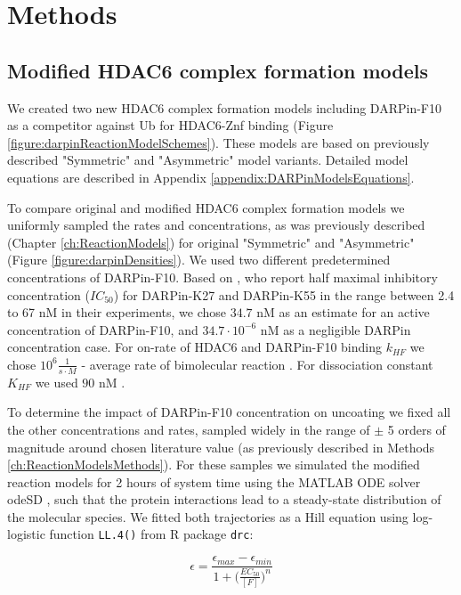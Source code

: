 \section{Methods}
\label{ch:DARPinMethods}

\subsection{Modified HDAC6 complex formation models}

We created two new HDAC6 complex formation models including DARPin-F10 as a competitor against Ub for HDAC6-Znf binding (Figure \ref{figure:darpinReactionModelSchemes}). These models are based on previously described "Symmetric" and "Asymmetric" model variants. Detailed model equations are described in Appendix \ref{appendix:DARPinModelsEquations}.

To compare original and modified HDAC6 complex formation models we uniformly sampled the rates and concentrations, as was previously described (Chapter \ref{ch:ReactionModels}) for original "Symmetric" and "Asymmetric" (Figure \ref{figure:darpinDensities}). We used two different predetermined concentrations of DARPin-F10. Based on \cite{guillard2017structural}, who report half maximal inhibitory concentration ($IC_{50}$) for DARPin-K27 and DARPin-K55 in the range between 2.4 to 67 nM in their experiments, we chose $34.7$ nM as an estimate for an active concentration of DARPin-F10, and  $34.7 \cdot 10^{-6}$ nM as a negligible DARPin concentration case. For on-rate of HDAC6 and DARPin-F10 binding $k_{HF}$ we chose $10^{6} \frac{1}{s\cdot M}$ - average rate of bimolecular reaction \cite{bionumbersbimolrate}. For dissociation constant $K_{HF}$ we used $90$ nM \cite{DarpinData}.

To determine the impact of DARPin-F10 concentration on uncoating we fixed all the other concentrations and rates, sampled widely in the range of $\pm$ 5 orders of magnitude around chosen literature value (as previously described in Methods \ref{ch:ReactionModelsMethods}). For these samples we simulated the modified reaction models for 2 hours of system time using the MATLAB ODE solver odeSD \cite{gonnet2012specialized}, such that the protein interactions lead to a steady-state distribution of the molecular species. We fitted both trajectories as a Hill equation using log-logistic function \texttt{LL.4()} from R package \texttt{drc}:

\begin{equation}
\epsilon=\frac{\epsilon_{max} - \epsilon_{min}}{1 + \big(\frac{EC_{50}}{[F]}\big)^n}
\end{equation}

